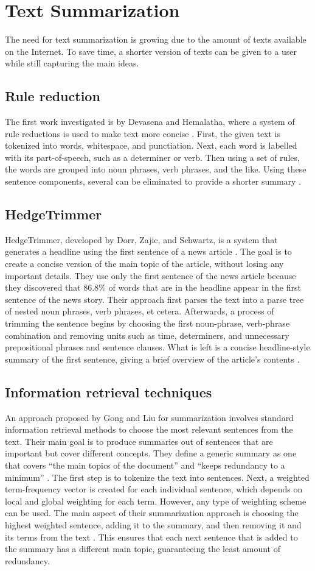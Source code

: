 \documentclass[11pt,titlepage]{report}
\begin{document}
\section{Text Summarization}
The need for text summarization is growing due to the amount of texts available on the Internet. To save time, a shorter version of texts can be given to a user while still capturing the main ideas.
\subsection{Rule reduction}
The first work investigated is by Devasena and Hemalatha, where a system of rule reductions is used to make text more concise \cite{devasena}. First, the given text is tokenized into words, whitespace, and punctiation. Next, each word is labelled with its part-of-speech, such as a determiner or verb. Then using a set of rules, the words are grouped into noun phrases, verb phrases, and the like. Using these sentence components, several can be eliminated to provide a shorter summary \cite{devasena}.
\subsection{HedgeTrimmer}
HedgeTrimmer, developed by Dorr, Zajic, and Schwartz, is a system that generates a headline using the first sentence of a news article \cite{hedgetrimmer}. The goal is to create a concise version of the main topic of the article, without losing any important details. They use only the first sentence of the news article because they discovered that 86.8\% of words that are in the headline appear in the first sentence of the news story. Their approach first parses the text into a parse tree of nested noun phrases, verb phrases, et cetera. Afterwards, a process of trimming the sentence begins by choosing the first noun-phrase, verb-phrase combination and removing units such as time, determiners, and unnecessary prepositional phrases and sentence clauses. What is left is a concise headline-style summary of the first sentence, giving a brief overview of the article’s contents \cite{hedgetrimmer}.
\subsection{Information retrieval techniques}
An approach proposed by Gong and Liu for summarization involves standard information retrieval methods to choose the most relevant sentences from the text. Their main goal is to produce summaries out of sentences that are important but cover different concepts. They define a generic summary as one that covers “the main topics of the document” and “keeps redundancy to a minimum” \cite{gong}. The first step is to tokenize the text into sentences. Next, a weighted term-frequency vector is created for each individual sentence, which depends on local and global weighting for each term. However, any type of weighting scheme can be used. The main aspect of their summarization approach is choosing the highest weighted sentence, adding it to the summary, and then removing it and its terms from the text \cite{gong}. This ensures that each next sentence that is added to the summary has a different main topic, guaranteeing the least amount of redundancy.
\end{document}
